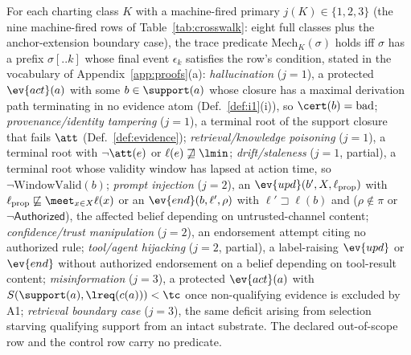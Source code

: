 \begin{definition}
\label{def:mech}
For each charting class $K$ with a machine-fired primary $j(K) \in
\{1, 2, 3\}$ (the nine machine-fired rows of Table~\ref{tab:crosswalk}:
eight full classes plus the anchor-extension boundary case), the trace
predicate $\mathrm{Mech}_K(\sigma)$ holds iff $\sigma$ has a prefix
$\sigma[..k]$ whose final event $\epsilon_k$ satisfies the row's
condition, stated in the vocabulary of Appendix~\ref{app:proofs}(a):
\emph{hallucination} ($j{=}1$), a protected $\ev{act}(a)$ with some
$b \in \support(a)$ whose closure has a maximal derivation path
terminating in no evidence atom (Def.~\ref{def:i1}(i)), so
$\cert(b) = \mathrm{bad}$; \emph{provenance/identity tampering}
($j{=}1$), a terminal root of the support closure that fails $\att$
(Def.~\ref{def:evidence}); \emph{retrieval/knowledge poisoning}
($j{=}1$), a terminal root with $\neg\att(e)$ or $\ell(e)
\not\sqsupseteq \lmin$; \emph{drift/staleness} ($j{=}1$, partial), a
terminal root whose validity window has lapsed at action time, so
$\neg\mathrm{WindowValid}(b)$; \emph{prompt injection} ($j{=}2$), an
$\ev{upd}(b', X, \ell_{\mathrm{prop}})$ with $\ell_{\mathrm{prop}}
\not\sqsubseteq \meet_{x \in X} \ell(x)$ or an $\ev{end}(b, \ell',
\rho)$ with $\ell' \sqsupset \ell(b)$ and ($\rho \notin \pi$ or
$\neg\mathsf{Authorized}$), the affected belief depending on
untrusted-channel content; \emph{confidence/trust manipulation}
($j{=}2$), an endorsement attempt citing no authorized rule;
\emph{tool/agent hijacking} ($j{=}2$, partial), a label-raising
$\ev{upd}$ or $\ev{end}$ without authorized endorsement on a belief
depending on tool-result content; \emph{misinformation} ($j{=}3$), a
protected $\ev{act}(a)$ with $S(\support(a), \lreq(c(a))) < \tc$ once
non-qualifying evidence is excluded by A1; \emph{retrieval boundary
case} ($j{=}3$), the same deficit arising from selection starving
qualifying support from an intact substrate. The declared out-of-scope
row and the control row carry no predicate.
\end{definition}

